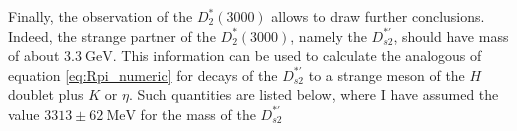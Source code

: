 Finally, the observation of the $D_2^*(3000)$ allows to draw further conclusions. Indeed, the strange partner of the $D^*_2(3000)$, namely the $D^{* \prime}_{s 2}$, should have mass of about $3.3 \ \text{GeV}$. This information can be used to calculate the analogous of equation \eqref{eq:Rpi_numeric} for decays of the $D^{* \prime}_{s 2}$ to a strange meson of the $H$ doublet plus $K$ or $\eta$. Such quantities are listed below, where I have assumed\footnotemark{} the value $3313 \pm 62 \ \text{MeV}$ for the mass of the $D^{* \prime}_{s 2}$

